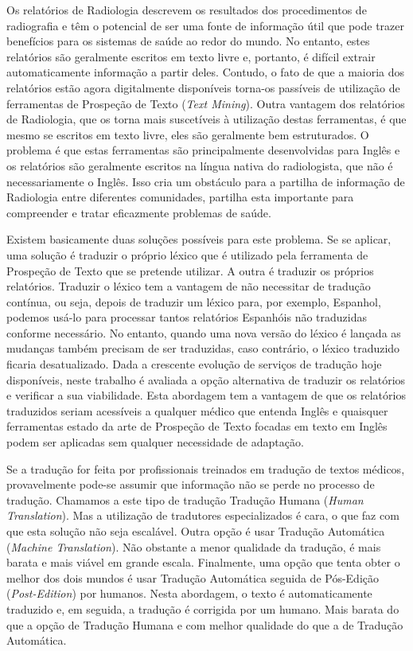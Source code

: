 \begin{abstractspt}
	
Os relatórios de Radiologia descrevem os resultados dos procedimentos de radiografia e têm o potencial de ser uma fonte de informação útil que pode trazer benefícios para os sistemas de saúde ao redor do mundo. No entanto, estes relatórios são geralmente escritos em texto livre e, portanto, é difícil extrair automaticamente informação a partir deles. Contudo, o fato de que a maioria dos relatórios estão agora digitalmente disponíveis torna-os passíveis de utilização de ferramentas de Prospeção de Texto (\textit{Text Mining}). Outra vantagem dos relatórios de Radiologia, que os torna mais suscetíveis à utilização destas ferramentas, é que mesmo se escritos em texto livre, eles são geralmente bem estruturados. O problema é que estas ferramentas são principalmente desenvolvidas para Inglês e os relatórios são geralmente escritos na língua nativa do radiologista, que não é necessariamente o Inglês. Isso cria um obstáculo para a partilha de informação de Radiologia entre diferentes comunidades, partilha esta importante para compreender e tratar eficazmente problemas de saúde.

Existem basicamente duas soluções possíveis para este problema. Se se aplicar, uma solução é traduzir o próprio léxico que é utilizado pela ferramenta de Prospeção de Texto que se pretende utilizar. A outra é traduzir os próprios relatórios. Traduzir o léxico tem a vantagem de não necessitar de tradução contínua, ou seja, depois de traduzir um léxico para, por exemplo, Espanhol, podemos usá-lo para processar tantos relatórios Espanhóis não traduzidas conforme necessário. No entanto, quando uma nova versão do léxico é lançada as mudanças também precisam de ser traduzidas, caso contrário, o léxico traduzido ficaria desatualizado. Dada a crescente evolução de serviços de tradução hoje disponíveis, neste trabalho é avaliada a opção alternativa de traduzir os relatórios e verificar a sua viabilidade. Esta abordagem tem a vantagem de que os relatórios traduzidos seriam acessíveis a qualquer médico que entenda Inglês e quaisquer ferramentas estado da arte de Prospeção de Texto focadas em texto em Inglês podem ser aplicadas sem qualquer necessidade de adaptação.

Se a tradução for feita por profissionais treinados em tradução de textos médicos, provavelmente pode-se assumir que informação não se perde no processo de tradução. Chamamos a este tipo de tradução Tradução Humana (\textit{Human Translation}). Mas a utilização de tradutores especializados é cara, o que faz com que esta solução não seja escalável. Outra opção é usar Tradução Automática (\textit{Machine Translation}). Não obstante a menor qualidade da tradução, é mais barata e mais viável em grande escala. Finalmente, uma opção que tenta obter o melhor dos dois mundos é usar Tradução Automática seguida de Pós-Edição (\textit{Post-Edition}) por humanos. Nesta abordagem, o texto é automaticamente traduzido e, em seguida, a tradução é corrigida por um humano. Mais barata do que a opção de Tradução Humana e com melhor qualidade do que a de Tradução Automática.


\end{abstractspt}
